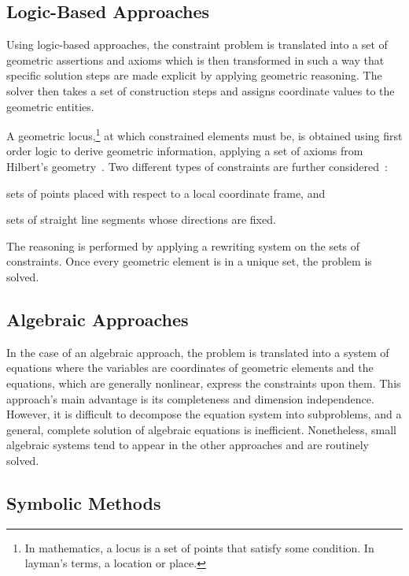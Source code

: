 \subsection{Logic-Based Approaches}%
\label{sec:intro.constraints.logic}

Using logic-based approaches, the constraint problem is translated into a set of
geometric assertions and axioms which is then transformed in such a way that
specific solution steps are made explicit by applying geometric reasoning.  The
solver then takes a set of construction steps and assigns coordinate values to
the geometric entities.

A geometric locus,\footnote{In mathematics, a locus is a set of points that
satisfy some condition.  In layman's terms, a location or place.} at which
constrained elements must be, is obtained using first order logic to derive
geometric information, applying a set of axioms from Hilbert's
geometry~\cite{Aldefeld:1988:VGBGRM,Sohrt:1991:IC3DM,Bruderlin:1993:USGRRSGSS}.
Two different types of constraints are further
considered~\cite{Sunde:1987:CADSDSS,Verroust:1992:RMPCAD}:
\begin{enumerate*}[label= (\arabic*)]
  \item sets of points placed with respect to a local coordinate frame, and
  \item sets of straight line segments whose directions are fixed.
\end{enumerate*}
The reasoning is performed by applying a rewriting system on the sets of
constraints.  Once every geometric element is in a unique set, the problem is
solved.

\subsection{Algebraic Approaches}%
\label{sec:intro.constraints.algebraic}

In the case of an algebraic approach, the problem is translated into a system of
equations where the variables are coordinates of geometric elements and the
equations, which are generally nonlinear, express the constraints upon them.
This approach's main advantage is its completeness and dimension independence.
However, it is difficult to decompose the equation system into subproblems, and
a general, complete solution of algebraic equations is inefficient.
Nonetheless, small algebraic systems tend to appear in the other approaches and
are routinely solved.

\subsection{Symbolic Methods}%
\label{sec:intro.constraints.symbolic}

